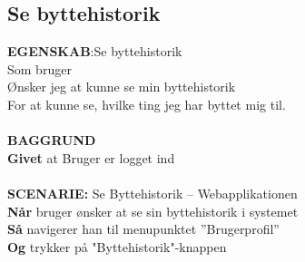 \subsection{Se byttehistorik}
{\color{blue}\textbf{EGENSKAB}:}Se byttehistorik \\
Som bruger \\
Ønsker jeg at kunne se min byttehistorik \\
For at kunne se, hvilke ting jeg har byttet mig til.\\ \\
{\color{blue}\textbf{BAGGRUND}} \\
{\color{blue}\textbf{Givet}} at Bruger er logget ind \\
\\
{\color{blue}\textbf{SCENARIE:}} Se Byttehistorik – Webapplikationen \\
{\color{blue}\textbf{Når}} bruger ønsker at se sin byttehistorik i systemet\\
{\color{blue}\textbf{Så}} navigerer han til menupunktet ”Brugerprofil” \\
{\color{blue}\textbf{Og}} trykker på "Byttehistorik"-knappen